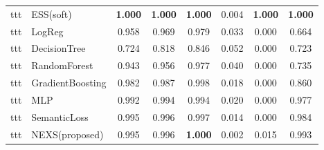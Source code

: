 \begin{table}[t]
{\begin{tabular}{llcccccc}
ttt & ESS(soft) & \textbf{1.000} & \textbf{1.000} & \textbf{1.000} & 0.004 & \textbf{1.000} & \textbf{1.000} \\
ttt & LogReg & 0.958 & 0.969 & 0.979 & 0.033 & 0.000 & 0.664 \\
ttt & DecisionTree & 0.724 & 0.818 & 0.846 & 0.052 & 0.000 & 0.723 \\
ttt & RandomForest & 0.943 & 0.956 & 0.977 & 0.040 & 0.000 & 0.735 \\
ttt & GradientBoosting & 0.982 & 0.987 & 0.998 & 0.018 & 0.000 & 0.860 \\
ttt & MLP & 0.992 & 0.994 & 0.994 & 0.020 & 0.000 & 0.977 \\
ttt & SemanticLoss & 0.995 & 0.996 & 0.997 & 0.014 & 0.000 & 0.984 \\
ttt & NEXS(proposed) & 0.995 & 0.996 & \textbf{1.000} & 0.002 & 0.015 & 0.993 \\
\bottomrule
\end{tabular}}
\end{table}